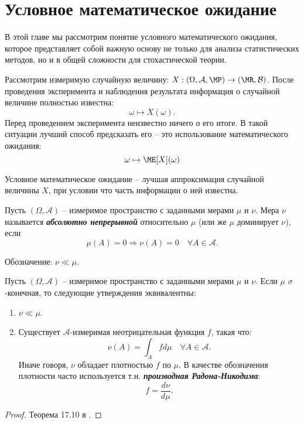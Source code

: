 \chapter{Условное математическое ожидание}

В этой главе мы рассмотрим понятие условного математического ожидания, которое представляет собой важную основу не только для анализа статистических методов, но и в общей сложности для стохастической теории.

\begin{rmrk} Рассмотрим измеримую случайную величину: $ X: (\Omega, \mathcal{A}, \MP) \rightarrow (\MR, \mathcal{B})$. После проведения эксперимента и наблюдения результата информация о случайной величине полностью известна:
	\[ \omega \mapsto X(\omega). \]
	Перед проведением эксперимента неизвестно ничего о его итоге. В такой ситуации лучший способ предсказать его -- это использование математического ожидания:
	\[ 	\omega \mapsto \ME[X](\omega) \]
	
	Условное математическое ожидание -- лучшая аппроксимация случайной величины $X$, при условии что часть информации о ней известна.
	\end{rmrk}

\begin{defn} Пусть $(\Omega, \mathcal{A})$ -- измеримое пространство с заданными мерами $\mu$ и $\nu$. Мера $\nu$ называется  \textbf{\textit{абсолютно непрерывной}} относительно $\mu$ (или же $\mu$ доминирует $\nu$), если
	\[\mu(A) = 0 \Longrightarrow \nu(A)=0 \quad \forall A \in \mathcal{A}.\]
	
	Обозначение: $\nu \ll \mu$.
\end{defn}


\begin{thm} \label{Radon Nikodym}
	 Пусть $(\Omega, \mathcal{A})$ -- измеримое пространство с заданными мерами $\mu$ и $\nu$. Если $\mu$ $\sigma$-конечная, то следующие утверждения эквивалентны:
	\begin{enumerate}
		\item $\nu \ll \mu$.
		\item Существует $\mathcal{A}$-измеримая неотрицательная функция $f$, такая что:
		\[\nu(A)=\int_{A} f d\mu \quad \forall A \in \mathcal{A}.\]
		Иначе говоря, $\nu$ обладает плотностью $f$ по $\mu$. В качестве обозначения плотности часто используется т.н. \textbf{\textit{производная Радона-Никодима}}:
		\[ f=\frac{d\nu}{d\mu}. \]
    \end{enumerate}
	\end{thm}
\begin{proof}
	Теорема 17.10 в \cite{Bauer}.
\end{proof}

